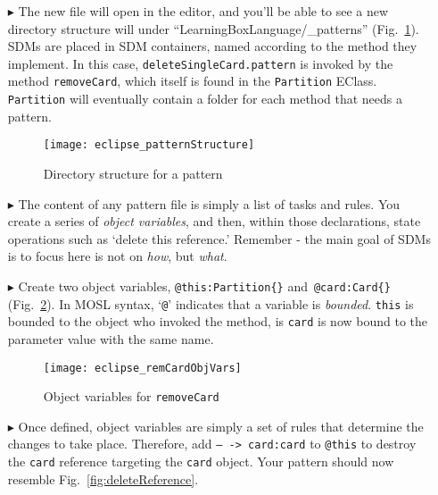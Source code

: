 \begin{itemize}
\newpage

\item[$\blacktriangleright$] The new file will open in the editor, and you'll be able to see a new directory structure will under
``LearningBoxLanguage/\_patterns'' (Fig.~\ref{fig:pattStruct}). SDMs are placed in SDM containers, named according to the method they implement. In this case,
\texttt{deleteSingleCard.pattern} is invoked by the method \texttt{removeCard}, which itself is found in the \texttt{Partition} EClass. \texttt{Partition} will
eventually contain a folder for each method that needs a pattern.

\vspace{0.5cm}

\begin{figure}[htp]
\begin{center}
  \texttt{[image: eclipse\_patternStructure]}
  \caption{Directory structure for a pattern}
  \label{fig:pattStruct}
\end{center}
\end{figure}

\item[$\blacktriangleright$] The content of any pattern file is simply a list of tasks and rules. You create a series of \emph{object variables}, and then,
within those declarations, state operations such as `delete this reference.' Remember - the main goal of SDMs is to focus here is not on \emph{how}, but
\emph{what}.

\vspace{0.5cm}

\item[$\blacktriangleright$] Create two object variables, \texttt{@this:Partition\{\}} and~\texttt{@card:Card\{\}} (Fig.~\ref{fig:remCardObjVar}). In MOSL
syntax, `\texttt{@}' indicates that a variable is \emph{bounded}. \texttt{this} is bounded to the object who invoked the method, is \texttt{card} is now bound
to the parameter value with the same name. 

\begin{figure}[htp]
\begin{center}
  \texttt{[image: eclipse\_remCardObjVars]}
  \caption{Object variables for \texttt{removeCard}}
  \label{fig:remCardObjVar}
\end{center}
\end{figure}

\clearpage

\item[$\blacktriangleright$] Once defined, object variables are simply a set of rules that determine the changes to take place. Therefore, add \texttt{-- ->
card:card} to \texttt{@this} to destroy the \texttt{card} reference targeting the \texttt{card} object.
Your pattern should now resemble Fig.~\ref{fig:deleteReference}.


\end{itemize}
